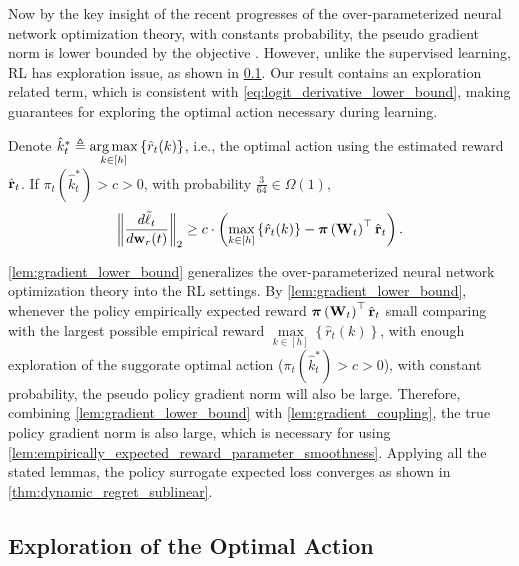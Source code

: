 Now by the key insight of the recent progresses of the over-parameterized neural network optimization theory, with constants probability, the pseudo gradient norm is lower bounded by the objective \citep{li2018learning}. However, unlike the supervised learning, RL has exploration issue, as shown in \cref{subsec:exploration_in_policy_learning}. Our result contains an exploration related term, which is consistent with \cref{eq:logit_derivative_lower_bound}, making guarantees for exploring the optimal action necessary during learning.

\begin{lem}
\label{lem:gradient_lower_bound}
	Denote $\hat{k}_t^* \triangleq \operatorname*{arg\,max}\limits_{k \in [h]}\left\{ \hat{r}_{t}(k) \right\}$, i.e., the optimal action using the estimated reward $ \hat{{\mathbf{r}}}_t$. If $\pi_{t}(\hat{k}_t^*) > c > 0$, with probability $\frac{3}{64} \in \Omega\left( 1 \right)$,
\begin{equation*}
\begin{split}
	\left\| \frac{d\tilde{\ell}_t}{d {\mathbf{w}}_r(t)} \right\|_2 \ge c \cdot \left( \max\limits_{k \in \left[h\right]}\left\{ \hat{r}_{t}(k) \right\} - {\boldsymbol{\pi}}\left( {\mathbf{W}}_t \right)^\top \hat{{\mathbf{r}}}_t \right) .
\end{split}
\end{equation*}
\end{lem}

\cref{lem:gradient_lower_bound} generalizes the over-parameterized neural network optimization theory into the RL settings. By \cref{lem:gradient_lower_bound}, whenever the policy empirically expected reward ${\boldsymbol{\pi}}\left( {\mathbf{W}}_t \right)^\top \hat{{\mathbf{r}}}_t$ small comparing with the largest possible empirical reward $\max\limits_{k \in \left[h\right]}\left\{ \hat{r}_{t}(k) \right\}$, with enough exploration of the suggorate optimal action ($\pi_{t}(\hat{k}_t^*) > c > 0$), with constant probability, the pseudo policy gradient norm will also be large. Therefore, combining \cref{lem:gradient_lower_bound} with \cref{lem:gradient_coupling}, the true policy gradient norm is also large, which is necessary for using \cref{lem:empirically_expected_reward_parameter_smoothness}. Applying all the stated lemmas, the policy surrogate expected loss converges as shown in \cref{thm:dynamic_regret_sublinear}.

\subsection{Exploration of the Optimal Action}
\label{subsec:exploration_in_policy_learning}


